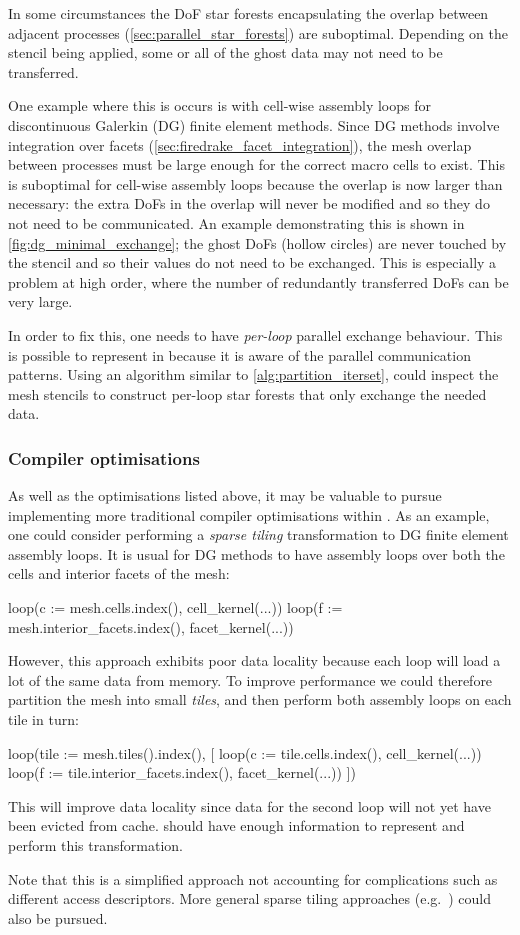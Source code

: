 \documentclass[thesis]{subfiles}
\begin{document}
In some circumstances the DoF star forests encapsulating the overlap between adjacent processes (\cref{sec:parallel_star_forests}) are suboptimal.
Depending on the stencil being applied, some or all of the ghost data may not need to be transferred.

One example where this is occurs is with cell-wise assembly loops for discontinuous Galerkin (DG) finite element methods.
Since DG methods involve integration over facets (\cref{sec:firedrake_facet_integration}), the mesh overlap between processes must be large enough for the correct macro cells to exist.
This is suboptimal for cell-wise assembly loops because the overlap is now larger than necessary: the extra DoFs in the overlap will never be modified and so they do not need to be communicated.
An example demonstrating this is shown in \cref{fig:dg_minimal_exchange}; the ghost DoFs (hollow circles) are never touched by the stencil and so their values do not need to be exchanged.
This is especially a problem at high order, where the number of redundantly transferred DoFs can be very large.

In order to fix this, one needs to have \emph{per-loop} parallel exchange behaviour.
This is possible to represent in  because it is aware of the parallel communication patterns.
Using an algorithm similar to \cref{alg:partition_iterset},  could inspect the mesh stencils to construct per-loop star forests that only exchange the needed data.

\subsubsection{Compiler optimisations}

As well as the optimisations listed above, it may be valuable to pursue implementing more traditional compiler optimisations within .
As an example, one could consider performing a \emph{sparse tiling} transformation to DG finite element assembly loops.
It is usual for DG methods to have assembly loops over both the cells and interior facets of the mesh:
\begin{pyinline}
  loop(c := mesh.cells.index(), cell_kernel(...))
  loop(f := mesh.interior_facets.index(), facet_kernel(...))
\end{pyinline}
However, this approach exhibits poor data locality because each loop will load a lot of the same data from memory.
To improve performance we could therefore partition the mesh into small \emph{tiles}, and then perform both assembly loops on each tile in turn:
\begin{pyinline}
  loop(tile := mesh.tiles().index(), [
    loop(c := tile.cells.index(), cell_kernel(...))
    loop(f := tile.interior_facets.index(), facet_kernel(...))
  ])
\end{pyinline}
This will improve data locality since data for the second loop will not yet have been evicted from cache.
 should have enough information to represent and perform this transformation.

Note that this is a simplified approach not accounting for complications such as different access descriptors.
More general sparse tiling approaches (e.g.~\cite{kriegerLoopChainingProgramming2013,stroutGeneralizingRunTimeTiling2014,luporiniAutomatedTilingUnstructured2019}) could also be pursued.
\end{document}
